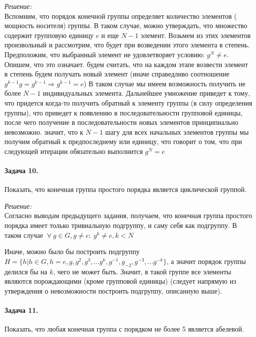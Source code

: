 \documentclass[10pt,a4paper]{article}
\begin{document}
	\textit{Решение:}\\
	
	Вспомним, что порядок конечной группы определяет количество элементов (
	мощность носителя) группы. В таком случае, можно утверждать, что множество 
	содержит групповую единицу $e$ и еще  $N - 1$ элемент. Возьмем из этих 
	элементов произвольный и рассмотрим, что будет при возведении этого элемента
	в степень. Предположим, что выбранный элемент не удовлетворяет условию:
	$g^{N} \neq e$. Опишем, что это означает. будем считать, что на каждом 
	этапе возвести элемент в степень будем получать новый элемент (иначе 
	справедливо соотношение $g^{k - 1}g = g^{k - 1} \Rightarrow g^{k - 1} = e$)
	В таком случае мы имеем возможность получить не более $N - 1$ индивидуальных
	элемента. Дальнейшее умножение приведет к тому, что придется когда-то 
	получить обратный к элементу группы (в силу определения группы), что 
	приведет к появлению в последовательности групповой единицы, после чего 
	получение в последовательности новых элементов принципиально невозможно. 
	значит, что к $N - 1$ шагу для всех начальных элементов группы мы получим 
	обратный к предпоследнему или единицу, что говорит о том, что при следующей
	итерации обязательно выполнится $g^{N} = e$
	
	\paragraph{Задача 10.} Показать, что конечная группа простого порядка 
	является циклической группой.
	
	\textit{Решение:}\\
	
	Согласно выводам предыдущего задания, получаем, что конечная группа простого 
	порядка имеет только тривиальную подгруппу, и саму себя как подгруппу. В 
	таком случае $\ \forall \ g \in G, g \neq e: \ g^{k} \neq e, k < N$
	
	Иначе, можно было бы построить подгруппу $H = \lbrace h | h \in G, h
	= e, g, g^{2}, g^{3}, \ldots g^{k}, g^{-1}, g_{-2}, g^{-3}, \ldots
	g^{-k}\rbrace$, а значит порядок группы делился бы на $k$, чего не может 
	быть. Значит, в такой группе все элементы являются порождающими (кроме 
	групповой единицы) (следует напрямую из утверждения о невозможности 
	построить подгруппу, описанную выше).
	
	\paragraph{Задача 11.} Показать, что любая конечная группа с порядком не 
	более 5 является абелевой.
	
\end{document}
